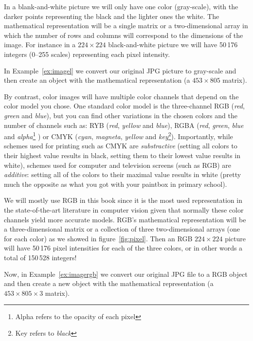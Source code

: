 In a blank-and-white picture we will only have one color (gray-scale), with the darker points representing the black and the lighter ones the white. The mathematical representation will be a single matrix or a two-dimensional array in which the number of rows and columns will correspond to the dimensions of the image. For instance in a $224 \times 224$ black-and-white picture we will have 50\,176 integers (0--255 scales) representing each pixel intensity.

In Example~\ref{ex:imagel} we convert our original JPG picture to gray-scale and then create an object with the mathematical representation (a $453 \times 805$ matrix).


By contrast, color images will have multiple color channels that depend on the color model you chose. One standard color model is the  three-channel RGB (\textit{red}, \textit{green} and \textit{blue}), but you can find other variations in the chosen colors and the number of channels such as: RYB (\textit{red}, \textit{yellow} and \textit{blue}), RGBA (\textit{red}, \textit{green}, \textit{blue} and \textit{alpha}\footnote{Alpha refers to the opacity of each pixel} ) or CMYK (\textit{cyan}, \textit{magneta}, \textit{yellow} and \textit{key}\footnote{Key refers to \textit{black}}).  Importantly, while schemes used for printing such as CMYK are \emph{substractive} (setting all colors to their highest value results in black, setting them to their lowest value results in white), schemes used for computer and television screens (such as RGB) are \emph{additive}: setting all of the colors to their maximal value results in white (pretty much the opposite as what you got with your paintbox in primary school).

We will mostly use RGB in this book since it is the most used representation in the state-of-the-art literature in computer vision given that normally these color channels yield more accurate models. RGB's mathematical representation will be a three-dimensional matrix or a collection of three two-dimensional arrays (one for each color) as we showed in figure~\ref{fig:pixel}. Then an RGB $224 \times 224$ picture will have 50\,176 pixel intensities for each of the three colors, or in other words a total of 150\,528 integers!

Now, in Example~\ref{ex:imagergb} we convert our original JPG file to a RGB object and then create a new object with the mathematical representation (a $453 \times 805 \times 3$ matrix).

